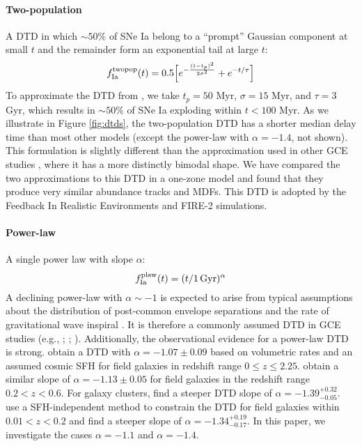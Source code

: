 \documentclass[twocolumn,twocolappendix,linenumbers,trackchanges]{aastex631}
\begin{document}
\paragraph{Two-population} A DTD in which $\sim50\%$ of SNe Ia belong to a ``prompt'' Gaussian component at small $t$ and the remainder form an exponential tail at large $t$:
\begin{equation}
    f_{\rm Ia}^{\rm twopop}(t) = 0.5\Big[e^{-\frac{(t-t_p)^2}{2\sigma^2}} + e^{-t/\tau}\Big]
    \label{eq:prompt-dtd}
\end{equation}
To approximate the DTD from \citet{Mannucci2006-TwoPopulations}, we take $t_p=50$ Myr, $\sigma=15$ Myr, and $\tau=3$ Gyr, which results in $\sim 50\%$ of SNe Ia exploding within $t<100$ Myr. As we illustrate in Figure \ref{fig:dtds}, the two-population DTD has a shorter median delay time than most other models (except the power-law with $\alpha=-1.4$, not shown).
This formulation is slightly different than the approximation used in other GCE studies \citep[e.g.,][]{Matteucci2006-BimodalDTDConsequences,Poulhazan2018-PrecisionPollution}, where it has a more distinctly bimodal shape. We have compared the two approximations to this DTD in a one-zone model and found that they produce very similar abundance tracks and MDFs. This DTD is adopted by the Feedback In Realistic Environments \citep[FIRE;][]{Hopkins2014-FIRE-1} and FIRE-2 \citep{Hopkins2018-FIRE-2} simulations.

\paragraph{Power-law} A single power law with slope $\alpha$:
\begin{equation}
    f_{\rm Ia}^{\rm plaw}(t) = (t/1\,\rm{Gyr})^\alpha
    \label{eq:powerlaw-dtd}
\end{equation}
A declining power-law with $\alpha\sim-1$ is expected to arise from typical assumptions about the distribution of post-common envelope separations and the rate of gravitational wave inspiral \citep[see Section 3.5 from][]{Maoz2014-Review}. It is therefore a commonly assumed DTD in GCE studies (e.g., \citealt{Rybizki2017-Chempy}; ; \citealt{Weinberg2023-CCSNYield}). Additionally, the observational evidence for a power-law DTD is strong. \citet{Maoz2017-CosmicDTD} obtain a DTD with $\alpha=-1.07\pm0.09$ based on volumetric rates and an assumed cosmic SFH for field galaxies in redshift range $0\leq z\leq 2.25$. \citet{Wiseman2021-DESRates} obtain a similar slope of $\alpha=-1.13\pm0.05$ for field galaxies in the redshift range $0.2<z<0.6$. For galaxy clusters, \citet{Maoz2017-CosmicDTD} find a steeper DTD slope of $\alpha=-1.39^{+0.32}_{-0.05}$. \citet{Heringer2019-FieldGalaxyDTD} use a SFH-independent method to constrain the DTD for field galaxies within $0.01<z<0.2$ and find a steeper slope of $\alpha=-1.34^{+0.19}_{-0.17}$.
In this paper, we investigate the cases $\alpha=-1.1$ and $\alpha=-1.4$.
\end{document}

